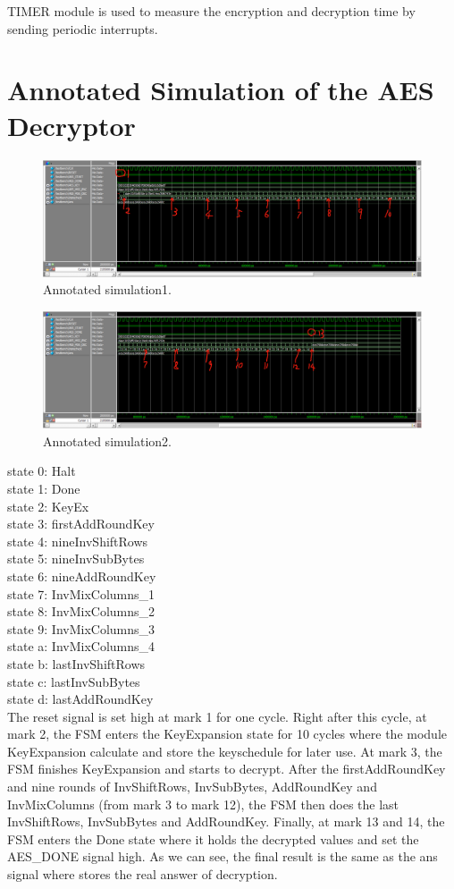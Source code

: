 \documentclass[12pt]{article}
\begin{document}
TIMER module is used to measure the encryption and decryption time by sending periodic interrupts.

\section{Annotated Simulation of the AES Decryptor}
\begin{figure}[H]
    \centering
    \includegraphics[width=18cm]{simulation1.png}
    \caption{Annotated simulation1.}
\end{figure}
\begin{figure}[H]
    \centering
    \includegraphics[width=18cm]{simulation2.png}
    \caption{Annotated simulation2.}
\end{figure}
state 0: Halt\\
state 1: Done\\
state 2: KeyEx\\
state 3: firstAddRoundKey\\
state 4: nineInvShiftRows\\
state 5: nineInvSubBytes\\
state 6: nineAddRoundKey\\
state 7: InvMixColumns\_1\\
state 8: InvMixColumns\_2\\
state 9: InvMixColumns\_3\\
state a: InvMixColumns\_4\\
state b: lastInvShiftRows\\
state c: lastInvSubBytes\\
state d: lastAddRoundKey\\

The reset signal is set high at mark 1 for one cycle. Right after this cycle, at mark 2, the FSM enters the KeyExpansion state for 10 cycles where the module KeyExpansion calculate and store the keyschedule for later use. At mark 3, the FSM finishes KeyExpansion and starts to decrypt. After the firstAddRoundKey and nine rounds of InvShiftRows, InvSubBytes, AddRoundKey and InvMixColumns (from mark 3 to mark 12), the FSM then does the last InvShiftRows, InvSubBytes and AddRoundKey.
Finally, at mark 13 and 14, the FSM enters the Done state where it holds the decrypted values and set the AES\_DONE signal high. As we can see, the final result is the same as the ans signal where stores the real answer of decryption.
\end{document}
